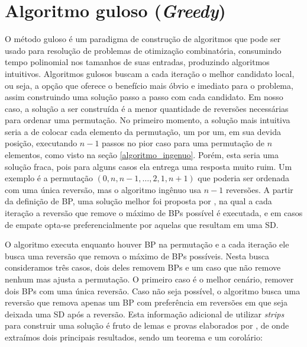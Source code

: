 
\section{Algoritmo guloso (\textit{Greedy})}


O método guloso é um paradigma de construção de algoritmos que pode ser usado para resolução de problemas de otimização combinatória, consumindo tempo polinomial nos tamanhos de suas entradas, produzindo algoritmos intuitivos. Algoritmos gulosos buscam a cada iteração o melhor candidato local, ou seja, a opção que oferece o benefício mais óbvio e imediato para o problema, assim construindo uma solução passo a passo com cada candidato. Em nosso caso, a solução a ser construída é a menor quantidade de reversões necessárias para ordenar uma permutação. No primeiro momento, a solução mais intuitiva seria a de colocar cada elemento da permutação, um por um, em sua devida posição, executando $n-1$ passos no pior caso para uma permutação de $n$ elementos, como visto na seção \ref{algoritmo_ingenuo}. Porém, esta seria uma solução fraca, pois para alguns casos ela entrega uma resposta muito ruim. Um exemplo é a permutação $(0, n, n-1, \ldots , 2, 1, n+1)$ que poderia ser ordenada com uma única reversão, mas o algoritmo ingênuo usa $n-1$ reversões. A partir da definição de BP, uma solução melhor foi proposta por \cite{kececioglu1995exact}, na qual a cada iteração a reversão que remove o máximo de BPs possível é executada, e em casos de empate opta-se preferencialmente por aquelas que resultam em uma SD. 

O algoritmo executa enquanto houver BP na permutação e a cada iteração ele busca uma reversão que remova o máximo de BPs possíveis. Nesta busca consideramos três casos, dois deles removem BPs e um caso que não remove nenhum mas ajusta a permutação. O primeiro caso é o  melhor cenário, remover dois BPs com uma única reversão. Caso não seja possível, o algoritmo busca uma reversão que remova apenas um BP com preferência em reversões em que seja deixada uma SD após a reversão. Esta informação adicional de utilizar \textit{strips} para construir uma solução é fruto de lemas e provas elaborados por \cite{kececioglu1995exact}, de onde extraímos dois principais resultados, sendo um teorema e um corolário:

